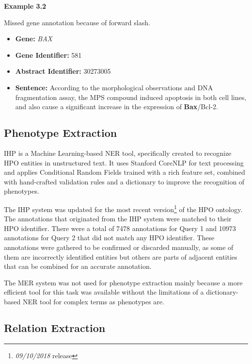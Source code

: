 \bigskip


\hypertarget{ex3.2}{\textbf{Example 3.2}} Missed gene annotation because of forward slash.
\begin{itemize}

\item\textbf{Gene:} \textit{BAX}
\item\textbf{Gene Identifier:} 581
\item\textbf{Abstract Identifier:} 30273005
\item\textbf{Sentence:} According to the morphological observations and DNA fragmentation assay, the MPS compound induced apoptosis in both cell lines, and also cause a significant increase in the expression of \textbf{Bax}/Bcl-2.

\end{itemize}



\subsection{Phenotype Extraction}

IHP is a Machine Learning-based  NER tool, specifically created to recognize HPO entities in unstructured text. It uses Stanford CoreNLP \citep{Manning2014} for text processing and applies Conditional Random Fields trained with a rich feature set, combined with hand-crafted validation rules and a dictionary to improve the recognition of phenotypes.

The IHP system was updated for the most recent version\footnote{\textit{09/10/2018} release} of the HPO ontology. The annotations that originated from the IHP system were matched to their HPO identifier. There were a total of 7478 annotations for Query 1 and 10973 annotations for Query 2 that did not match any HPO identifier. These annotations were gathered to be confirmed or discarded manually, as some of them are incorrectly identified entities but others are parts of adjacent entities that can be combined for an accurate annotation.

The MER system was not used for phenotype extraction mainly because a more efficient tool for this task was available without the limitations of a dictionary-based NER tool for complex terms as phenotypes are.

\subsection{Relation Extraction}

